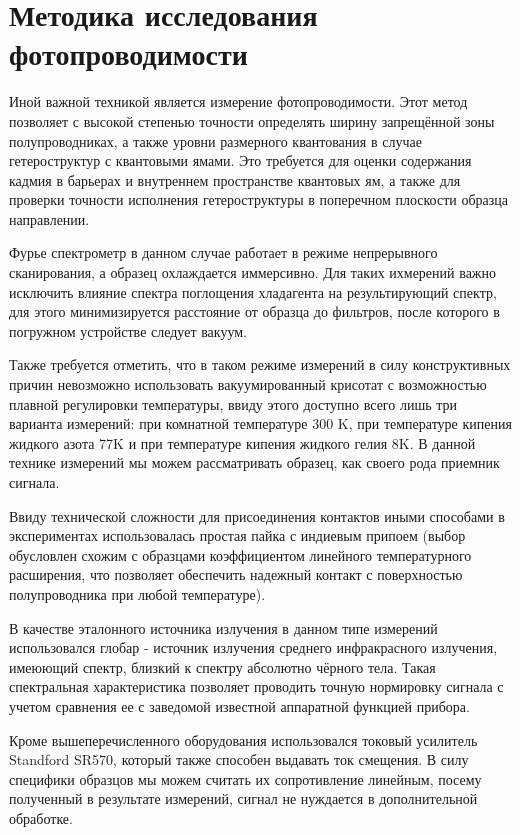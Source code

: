 \documentclass[../main.tex]{subfiles}
\begin{document}
    
    \section{Методика исследования фотопроводимости}
    Иной важной техникой является измерение фотопроводимости. Этот метод позволяет с высокой степенью точности
    определять ширину запрещённой зоны полупроводниках, а также уровни размерного квантования в случае гетероструктур
    с квантовыми ямами. Это требуется для оценки содержания кадмия в барьерах и внутреннем пространстве квантовых ям, а также
    для проверки точности исполнения гетероструктуры в поперечном плоскости образца направлении.

    Фурье спектрометр в данном случае работает в режиме непрерывного сканирования, а образец охлаждается иммерсивно.
    Для таких ихмерений важно исключить влияние спектра поглощения хладагента на результирующий спектр, для этого
    минимизируется расстояние от образца до фильтров, после которого в погружном устройстве следует вакуум.
    
    Также требуется отметить, что в таком режиме измерений в силу конструктивных причин невозможно использовать вакуумированный
    крисотат с возможностью плавной регулировки температуры, ввиду этого доступно всего лишь три варианта измерений:
    при комнатной температуре 300 K, при температуре кипения жидкого азота 77K и при температуре кипения жидкого гелия 8K. В
    данной технике измерений мы можем рассматривать образец, как своего рода приемник сигнала. 
    
    Ввиду технической сложности для присоединения контактов иными способами в экспериментах использовалась простая пайка
    с индиевым припоем (выбор обусловлен схожим с образцами коэффициентом линейного температурного расширения, что позволяет 
    обеспечить надежный контакт с поверхностью полупроводника при любой температуре).

    В качестве эталонного источника излучения в данном типе измерений использовался глобар - источник излучения среднего 
    инфракрасного излучения, имеюющий спектр, близкий к спектру абсолютно чёрного тела. Такая спектральная характеристика
    позволяет проводить точную нормировку сигнала с учетом сравнения ее с заведомой известной аппаратной
    функцией прибора.
    
    Кроме вышеперечисленного оборудования использовался токовый усилитель Standford SR570, который также способен выдавать
    ток смещения. В силу специфики образцов мы можем считать их сопротивление линейным, посему полученный
    в результате измерений, сигнал не нуждается в дополнительной обработке.
\end{document}
